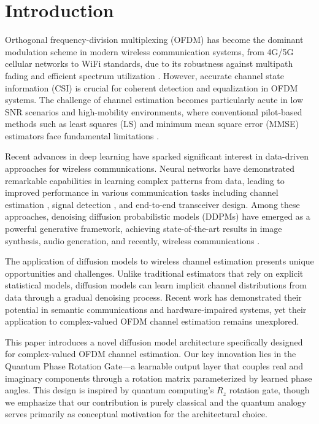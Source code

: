 \documentclass[conference]{IEEEtran}
\begin{document}
\section{Introduction}

Orthogonal frequency-division multiplexing (OFDM) has become the dominant modulation scheme in modern wireless communication systems, from 4G/5G cellular networks to WiFi standards, due to its robustness against multipath fading and efficient spectrum utilization \cite{ye2017power}. However, accurate channel state information (CSI) is crucial for coherent detection and equalization in OFDM systems. The challenge of channel estimation becomes particularly acute in low SNR scenarios and high-mobility environments, where conventional pilot-based methods such as least squares (LS) and minimum mean square error (MMSE) estimators face fundamental limitations \cite{zheng2020intelligent}.

Recent advances in deep learning have sparked significant interest in data-driven approaches for wireless communications. Neural networks have demonstrated remarkable capabilities in learning complex patterns from data, leading to improved performance in various communication tasks including channel estimation \cite{ye2017power}, signal detection \cite{zhao2021deepwaveform}, and end-to-end transceiver design. Among these approaches, denoising diffusion probabilistic models (DDPMs) \cite{ho2020denoising} have emerged as a powerful generative framework, achieving state-of-the-art results in image synthesis, audio generation, and recently, wireless communications \cite{yang2025diffusion}.

The application of diffusion models to wireless channel estimation presents unique opportunities and challenges. Unlike traditional estimators that rely on explicit statistical models, diffusion models can learn implicit channel distributions from data through a gradual denoising process. Recent work has demonstrated their potential in semantic communications \cite{wu2023cddm} and hardware-impaired systems, yet their application to complex-valued OFDM channel estimation remains unexplored.

This paper introduces a novel diffusion model architecture specifically designed for complex-valued OFDM channel estimation. Our key innovation lies in the Quantum Phase Rotation Gate—a learnable output layer that couples real and imaginary components through a rotation matrix parameterized by learned phase angles. This design is inspired by quantum computing's $R_z$ rotation gate, though we emphasize that our contribution is purely classical and the quantum analogy serves primarily as conceptual motivation for the architectural choice.
\end{document}
